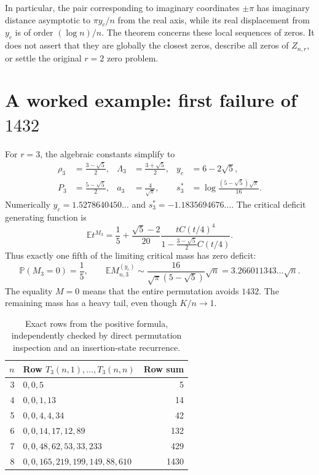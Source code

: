 \documentclass[11pt]{article}
\numberwithin{equation}{section}
\theoremstyle{definition}
\newcommand{\E}{\mathbb E}
\newcommand{\Prob}{\mathbb P}
\begin{document}
In particular, the pair corresponding to imaginary coordinates
\(\pm\pi\) has imaginary distance asymptotic to \(\pi y_c/n\) from
the real axis, while its real displacement from \(y_c\) is of order
\((\log n)/n\). The theorem concerns these local sequences of zeros.
It does not assert that they are globally the closest zeros, describe
all zeros of \(Z_{n,r}\), or settle the original \(r=2\) zero problem.

\section{A worked example: first failure of \texorpdfstring{\(1432\)}{1432}}
\label{fpf:lp:sec:example}

For \(r=3\), the algebraic constants simplify to
\begin{align}
 \rho_3&=\frac{3-\sqrt5}{2},&
 \Lambda_3&=\frac{3+\sqrt5}{2},&
 y_c&=6-2\sqrt5,\label{fpf:lp:eq:golden1}\\
 P_3&=\frac{5-\sqrt5}{2},&
 a_3&=\frac4{\sqrt\pi},&
 s_3^*&=\log\frac{(5-\sqrt5)\sqrt\pi}{16}.
 \label{fpf:lp:eq:golden2}
\end{align}
Numerically \(y_c=1.5278640450\ldots\) and
\(s_3^*=-1.1835694676\ldots\).
The critical deficit generating function is
\begin{equation}\label{fpf:lp:eq:golden-pgf}
 \E t^{M_3}=\frac15+
 \frac{\sqrt5-2}{20}
 \frac{tC(t/4)^4}{1-\frac{3-\sqrt5}{2}C(t/4)}.
\end{equation}
Thus exactly one fifth of the limiting critical mass has zero deficit:
\begin{equation}\label{fpf:lp:eq:golden-moments}
 \Prob(M_3=0)=\frac15,\qquad
 \E M_{n,3}^{(y_c)}\sim
 \frac{16}{\sqrt\pi(5-\sqrt5)}\sqrt n
 =3.266011343\ldots\sqrt n.
\end{equation}
The equality \(M=0\) means that the entire permutation avoids \(1432\).
The remaining mass has a heavy tail, even though \(K/n\to1\).

\begin{table}[ht]
\centering\small
\begin{tabular}{@{}r l r@{}}
\toprule
\(n\) & Row \(T_3(n,1),\ldots,T_3(n,n)\) & Row sum \\
\midrule
3 & \(0,0,5\) & 5 \\
4 & \(0,0,1,13\) & 14 \\
5 & \(0,0,4,4,34\) & 42 \\
6 & \(0,0,14,17,12,89\) & 132 \\
7 & \(0,0,48,62,53,33,233\) & 429 \\
8 & \(0,0,165,219,199,149,88,610\) & 1430 \\
\bottomrule
\end{tabular}
\caption{Exact rows from the positive formula, independently checked by
direct permutation inspection and an insertion-state recurrence.}
\label{fpf:lp:tab:exact}
\end{table}
\end{document}
